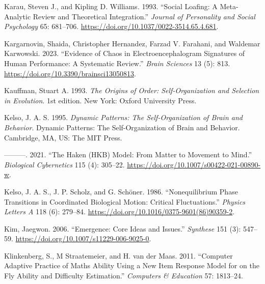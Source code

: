 \documentclass[
  a4paper,
  DIV=11,
  numbers=noendperiod,
  oneside]{scrreprt}
\newlength{\cslhangindent}
\newlength{\cslentryspacingunit} %
\newenvironment{CSLReferences}[2] %
 {%
  \setlength{\parindent}{0pt}
  \ifodd #1
  \let\oldpar\par
  \def\par{\hangindent=\cslhangindent\oldpar}
  \fi
  \setlength{\parskip}{#2\cslentryspacingunit}
 }%
 {}
\begin{document}
\begin{CSLReferences}{1}{0}
\leavevmode{}%
Karau, Steven J., and Kipling D. Williams. 1993. {``Social Loafing: {A}
Meta-Analytic Review and Theoretical Integration.''} \emph{Journal of
Personality and Social Psychology} 65: 681--706.
\url{https://doi.org/10.1037/0022-3514.65.4.681}.

\leavevmode{}%
Kargarnovin, Shaida, Christopher Hernandez, Farzad V. Farahani, and
Waldemar Karwowski. 2023. {``Evidence of Chaos in Electroencephalogram
Signatures of Human Performance: A Systematic Review.''} \emph{Brain
Sciences} 13 (5): 813. \url{https://doi.org/10.3390/brainsci13050813}.

\leavevmode{}%
Kauffman, Stuart A. 1993. \emph{The {Origins} of {Order}:
{Self-Organization} and {Selection} in {Evolution}}. 1st edition. {New
York}: {Oxford University Press}.

\leavevmode{}%
Kelso, J. A. S. 1995. \emph{Dynamic Patterns: {The} Self-Organization of
Brain and Behavior}. Dynamic Patterns: {The} Self-Organization of Brain
and Behavior. {Cambridge, MA, US}: {The MIT Press}.

\leavevmode{}%
---------. 2021. {``The {Haken}
({HKB}) Model: From Matter to Movement to Mind.''} \emph{Biological
Cybernetics} 115 (4): 305--22.
\url{https://doi.org/10.1007/s00422-021-00890-w}.

\leavevmode{}%
Kelso, J. A. S., J. P. Scholz, and G. Schöner. 1986. {``Nonequilibrium
Phase Transitions in Coordinated Biological Motion: Critical
Fluctuations.''} \emph{Physics Letters A} 118 (6): 279--84.
\url{https://doi.org/10.1016/0375-9601(86)90359-2}.

\leavevmode{}%
Kim, Jaegwon. 2006. {``Emergence: {Core} Ideas and Issues.''}
\emph{Synthese} 151 (3): 547--59.
\url{https://doi.org/10.1007/s11229-006-9025-0}.

\leavevmode{}%
Klinkenberg, S., M Straatemeier, and H. van der Maas. 2011. {``Computer
Adaptive Practice of {Maths} Ability Using a New Item Response Model for
on the Fly Ability and Difficulty Estimation.''} \emph{Computers \&
Education} 57: 1813--24.


\end{CSLReferences}
\end{document}
